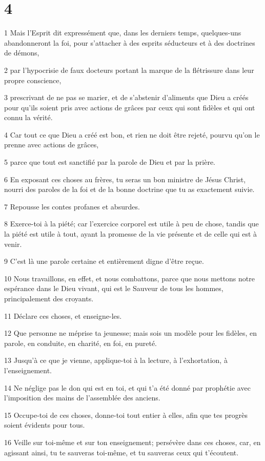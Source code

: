\chapter{4}

\par 1 Mais l'Esprit dit expressément que, dans les derniers temps, quelques-uns abandonneront la foi, pour s'attacher à des esprits séducteurs et à des doctrines de démons,
\par 2 par l'hypocrisie de faux docteurs portant la marque de la flétrissure dans leur propre conscience,
\par 3 prescrivant de ne pas se marier, et de s'abstenir d'aliments que Dieu a créés pour qu'ils soient pris avec actions de grâces par ceux qui sont fidèles et qui ont connu la vérité.
\par 4 Car tout ce que Dieu a créé est bon, et rien ne doit être rejeté, pourvu qu'on le prenne avec actions de grâces,
\par 5 parce que tout est sanctifié par la parole de Dieu et par la prière.
\par 6 En exposant ces choses au frères, tu seras un bon ministre de Jésus Christ, nourri des paroles de la foi et de la bonne doctrine que tu as exactement suivie.
\par 7 Repousse les contes profanes et absurdes.
\par 8 Exerce-toi à la piété; car l'exercice corporel est utile à peu de chose, tandis que la piété est utile à tout, ayant la promesse de la vie présente et de celle qui est à venir.
\par 9 C'est là une parole certaine et entièrement digne d'être reçue.
\par 10 Nous travaillons, en effet, et nous combattons, parce que nous mettons notre espérance dans le Dieu vivant, qui est le Sauveur de tous les hommes, principalement des croyants.
\par 11 Déclare ces choses, et enseigne-les.
\par 12 Que personne ne méprise ta jeunesse; mais sois un modèle pour les fidèles, en parole, en conduite, en charité, en foi, en pureté.
\par 13 Jusqu'à ce que je vienne, applique-toi à la lecture, à l'exhortation, à l'enseignement.
\par 14 Ne néglige pas le don qui est en toi, et qui t'a été donné par prophétie avec l'imposition des mains de l'assemblée des anciens.
\par 15 Occupe-toi de ces choses, donne-toi tout entier à elles, afin que tes progrès soient évidents pour tous.
\par 16 Veille sur toi-même et sur ton enseignement; persévère dans ces choses, car, en agissant ainsi, tu te sauveras toi-même, et tu sauveras ceux qui t'écoutent.

